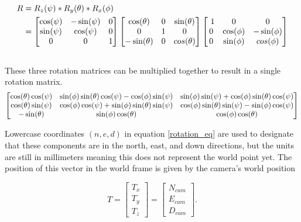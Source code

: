   \begin{align}
  \label{rotation_equation}
  R &= R_z(\psi)*R_y(\theta)*R_x(\phi) \\ \notag
    &= \begin{bmatrix} \cos(\psi)  & -\sin(\psi) & 0 \\ 
                        \sin(\psi) & \cos(\psi) & 0 \\
                         0         &   0         & 1  \end{bmatrix} 
       \begin{bmatrix} \cos(\theta) & 0 & \sin(\theta) \\ 
                             0      & 1 &       0        \\
                      -\sin(\theta) & 0 & cos(\theta) \end{bmatrix}
       \begin{bmatrix} \ 1 &    0       & 0           \\ 
                         0 & \cos(\phi) & -\sin(\phi) \\
                         0 & \sin(\phi) & cos(\phi)  \end{bmatrix} \\ \notag
    \end{align}
These three rotation matrices can be multiplied together to result in a single rotation matrix.
    \begin{equation}
    \begin{bmatrix} \cos(\theta)\cos(\psi) & \sin(\phi)\sin(\theta)\cos(\psi) - \cos(\phi)\sin(\psi) &  \sin(\phi)\sin(\psi) +  \cos(\phi)\sin(\theta)\cos(\psi) \\
    \cos(\theta)\sin(\psi) & \cos(\phi)\cos(\psi) + \sin(\phi)\sin(\theta)\sin(\psi) &  \cos(\phi)\sin(\theta)\sin(\psi) - \sin(\phi)\cos(\psi) \\
     -\sin(\theta) & \sin(\phi)\cos(\theta) & \cos(\phi)\cos(\theta)     \end{bmatrix}
     \notag
    \end{equation}
  
 Lowercase coordinates $(n,e,d)$ in equation \ref{rotation_eq} are used to designate that these components are in the north, east, and down directions, but the units are still in millimeters meaning this does not represent the world point yet.  The position of this vector in the world frame is given by the camera's world position

 \begin{equation}
 \label{translation_equation}
 T = 
 \begin{bmatrix} T_x \\ T_y \\ T_z \end{bmatrix} =
 \begin{bmatrix} N_{cam} \\ E_{cam} \\ D_{cam} \end{bmatrix}
 .
 \end{equation}

